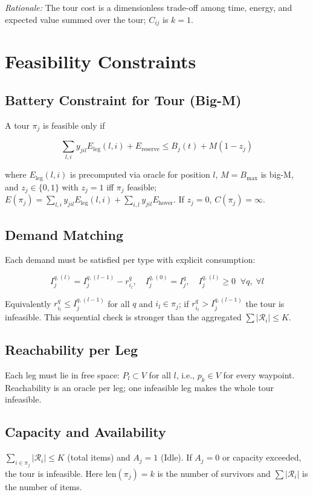 \documentclass[conference]{IEEEtran}
\begin{document}
\textit{Rationale:} The tour cost is a dimensionless trade-off among time, energy, and expected value summed over the tour; $C_{ij}$ is $k=1$.

\section{Feasibility Constraints}

\subsection{Battery Constraint for Tour (Big-M)}
A tour $\pi_j$ is feasible only if

\begin{equation}
\sum_{l,i} y_{jil}E_{\text{leg}}(l,i) + E_{\text{reserve}} \leq B_j(t) + M(1-z_j)
\label{eq:battery}
\end{equation}

where $E_{\text{leg}}(l,i)$ is precomputed via oracle for position $l$, $M=B_{\max}$ is big-M, and $z_j\in\{0,1\}$ with $z_j=1$ iff $\pi_j$ feasible; $E(\pi_j)=\sum_{l,i}y_{jil}E_{\text{leg}}(l,i)+\sum_{i,l}y_{jil}E_{\text{hover}}$. If $z_j=0$, $C(\pi_j)=\infty$.

\subsection{Demand Matching}
Each demand must be satisfied per type with explicit consumption:

\begin{equation}
I_j^{q,(l)} = I_j^{q,(l-1)} - r_{i_l}^q, \quad I_j^{q,(0)}=I_j^q, \quad I_j^{q,(l)} \geq 0 \;\; \forall q,\; \forall l
\end{equation}

Equivalently $r_{i_l}^q \leq I_j^{q,(l-1)}$ for all $q$ and $i_l\in\pi_j$; if $r_{i_l}^q > I_j^{q,(l-1)}$ the tour is infeasible. This sequential check is stronger than the aggregated $\sum|\mathcal{R}_i|\leq K$.

\subsection{Reachability per Leg}
Each leg must lie in free space: $P_{l}\subset V$ for all $l$, i.e., $p_k\in V$ for every waypoint. Reachability is an oracle per leg; one infeasible leg makes the whole tour infeasible.

\subsection{Capacity and Availability}
$\sum_{i\in\pi_j}|\mathcal{R}_i|\leq K$ (total items) and $A_j=1$ (Idle). If $A_j=0$ or capacity exceeded, the tour is infeasible. Here $\text{len}(\pi_j)=k$ is the number of survivors and $\sum|\mathcal{R}_i|$ is the number of items.
\end{document}
